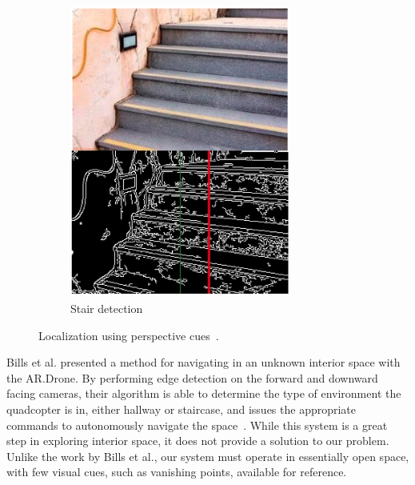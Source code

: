 \begin{figure}[ht]
            ~ %
            \begin{subfigure}[b]{0.5\textwidth}
                    \centering
                    \includegraphics[width=0.8\textwidth]{../images/Bills2.png}
                    \caption{Stair detection}
            \end{subfigure}
            \caption{Localization using perspective cues~\cite{Bills}.}
    \end{figure}

	Bills et al. presented a method for navigating in an unknown interior space with the AR.Drone. By performing edge detection on the forward and downward facing cameras, their algorithm is able to determine the type of environment the quadcopter is in, either hallway or staircase, and issues the appropriate commands to autonomously navigate the space~\cite{Bills}. While this system is a great step in exploring interior space, it does not provide a solution to our problem. Unlike the work by Bills et al., our system must operate in essentially open space, with few visual cues, such as vanishing points, available for reference.

